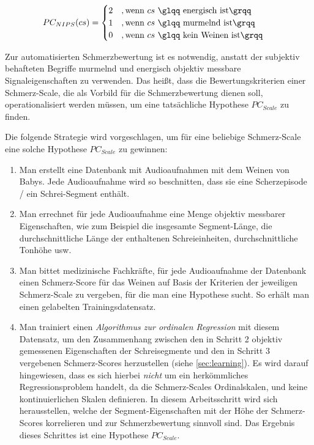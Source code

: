 \begin{equation}
PC_{NIPS}(cs) = \begin{cases}
 2 \quad ,\text{wenn } cs \text{ \glqq energisch ist\grqq } \\
 1 \quad ,\text{wenn } cs \text{ \glqq murmelnd ist\grqq } \\
 0 \quad ,\text{wenn } cs \text{ \glqq kein Weinen ist\grqq }
 \end{cases}	
\end{equation}

Zur automatisierten Schmerzbewertung ist es notwendig, anstatt der subjektiv behafteten Begriffe \glqq murmelnd\grqq{} und \glqq energisch\grqq{} objektiv messbare Signaleigenschaften zu verwenden. Das heißt, dass die Bewertungskriterien einer Schmerz-Scale, die als Vorbild für die Schmerzbewertung dienen soll, operationalisiert werden müssen, um eine tatsächliche Hypothese $PC_{Scale}$ zu finden.


Die folgende Strategie wird vorgeschlagen, um für eine beliebige Schmerz-Scale eine solche Hypothese $PC_{Scale}$ zu gewinnen:

\begin{enumerate}
 \item Man erstellt eine Datenbank mit Audioaufnahmen mit dem Weinen von Babys. Jede Audioaufnahme wird so beschnitten, dass sie eine Scherzepisode / ein Schrei-Segment enthält.
 \item Man errechnet für jede Audioaufnahme eine Menge objektiv messbarer Eigenschaften, wie zum Beispiel die insgesamte Segment-Länge, die durchschnittliche Länge der enthaltenen Schreieinheiten, durchschnittliche Tonhöhe usw.
 \item Man bittet medizinische Fachkräfte, für jede Audioaufnahme der Datenbank einen Schmerz-Score für das Weinen auf Basis der Kriterien der jeweiligen Schmerz-Scale zu vergeben, für die man eine Hypothese sucht. So erhält man einen gelabelten Trainingsdatensatz.
 \item Man trainiert einen \emph{Algorithmus zur ordinalen Regression} mit diesem Datensatz, um den Zusammenhang zwischen den in Schritt 2 objektiv gemessenen Eigenschaften der Schreisegmente und den in Schritt 3 vergebenen Schmerz-Scores herzustellen (siehe \autoref{sec:learning}). Es wird darauf hingewiesen, dass es sich hierbei \emph{nicht} um ein herkömmliches Regressionsproblem handelt, da die Schmerz-Scales Ordinalskalen, und keine kontinuierlichen Skalen definieren. In diesem Arbeitsschritt wird sich herausstellen, welche der Segment-Eigenschaften mit der Höhe der Schmerz-Scores korrelieren und zur Schmerzbewertung sinnvoll sind. Das Ergebnis dieses Schrittes ist eine Hypothese $PC_{Scale}$.
\end{enumerate}

